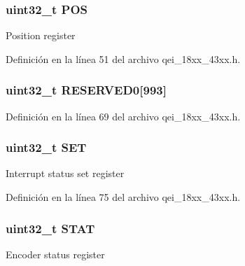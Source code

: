\subsubsection[{\texorpdfstring{P\+OS}{POS}}]{ uint32\+\_\+t P\+OS}\hypertarget{struct_l_p_c___q_e_i___t_ad349c0799c073bca3bdc59ca2f1f2ffd}{}\label{struct_l_p_c___q_e_i___t_ad349c0799c073bca3bdc59ca2f1f2ffd}
Position register 

Definición en la línea 51 del archivo qei\+\_\+18xx\+\_\+43xx.\+h.

\subsubsection[{\texorpdfstring{R\+E\+S\+E\+R\+V\+E\+D0}{RESERVED0}}]{ uint32\+\_\+t R\+E\+S\+E\+R\+V\+E\+D0\mbox{[}993\mbox{]}}\hypertarget{struct_l_p_c___q_e_i___t_a37862d4673a884c0accc80fd33dc1009}{}\label{struct_l_p_c___q_e_i___t_a37862d4673a884c0accc80fd33dc1009}


Definición en la línea 69 del archivo qei\+\_\+18xx\+\_\+43xx.\+h.

\subsubsection[{\texorpdfstring{S\+ET}{SET}}]{ uint32\+\_\+t S\+ET}\hypertarget{struct_l_p_c___q_e_i___t_a0c0c9e0fcf2cd860d7b5328ce56b88c9}{}\label{struct_l_p_c___q_e_i___t_a0c0c9e0fcf2cd860d7b5328ce56b88c9}
Interrupt status set register 

Definición en la línea 75 del archivo qei\+\_\+18xx\+\_\+43xx.\+h.

\subsubsection[{\texorpdfstring{S\+T\+AT}{STAT}}]{ uint32\+\_\+t S\+T\+AT}\hypertarget{struct_l_p_c___q_e_i___t_a9d37b00631f37ab3e4a127a7fee46da7}{}\label{struct_l_p_c___q_e_i___t_a9d37b00631f37ab3e4a127a7fee46da7}
Encoder status register 

